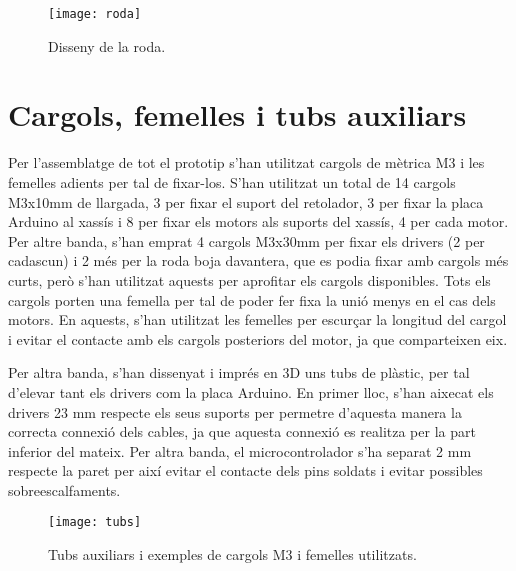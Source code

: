 \begin{figure}[H]
	\centering
	\texttt{[image: roda]}
	\caption{Disseny de la roda.}
	\label{fig:roda}
\end{figure}


\section{Cargols, femelles i tubs auxiliars}

Per l’assemblatge de tot el prototip s’han utilitzat cargols de mètrica M3 i les femelles adients per tal de fixar-los. S’han utilitzat un total de 14 cargols M3x10mm de llargada, 3 per fixar el suport del retolador, 3 per fixar la placa Arduino al xassís i 8 per fixar els motors als suports del xassís, 4 per cada motor. Per altre banda, s’han emprat 4 cargols M3x30mm per fixar els drivers (2 per cadascun) i 2 més per la roda boja davantera, que es podia fixar amb cargols més curts, però s’han utilitzat aquests per aprofitar els cargols disponibles. Tots els cargols porten una femella per tal de poder fer fixa la unió menys en el cas dels motors. En aquests, s'han utilitzat les femelles per escurçar la longitud del cargol i evitar el contacte amb els cargols posteriors del motor, ja que comparteixen eix. 

Per altra banda, s'han dissenyat i imprés en 3D uns tubs de plàstic, per tal d’elevar tant els drivers com la placa Arduino. En primer lloc, s’han aixecat els drivers 23 mm respecte els seus suports per permetre d’aquesta manera la correcta connexió dels cables, ja que aquesta connexió es realitza per la part inferior del mateix. Per altra banda, el microcontrolador s’ha separat 2 mm respecte la paret per així evitar el contacte dels pins soldats i evitar possibles sobreescalfaments. 

\begin{figure}[H]
	\centering
	\texttt{[image: tubs]}
	\caption{Tubs auxiliars i exemples de cargols M3 i femelles utilitzats.}
	\label{fig:tubs}
\end{figure}




  

